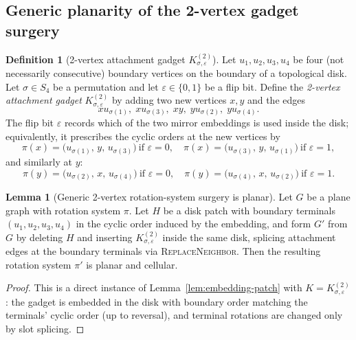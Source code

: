 \documentclass[12pt]{article}
\theoremstyle{definition}
\newtheorem{lemma}[theorem]{Lemma}
\newtheorem{definition}[theorem]{Definition}
\newcommand{\RefinedCFourGadgetVertices}{2}
\begin{document}
\subsection{Generic planarity of the \RefinedCFourGadgetVertices-vertex gadget surgery}
\label{subsec:generic-2v-planarity}

\begin{definition}[\RefinedCFourGadgetVertices-vertex attachment gadget $K^{(2)}_{\sigma,\varepsilon}$]
\label{def:2v-gadget}
Let $u_1,u_2,u_3,u_4$ be four (not necessarily consecutive) boundary vertices on the boundary of a topological disk.
Let $\sigma \in S_4$ be a permutation and let $\varepsilon\in\{0,1\}$ be a flip bit.
Define the \emph{\RefinedCFourGadgetVertices-vertex attachment gadget} $K^{(2)}_{\sigma,\varepsilon}$ by adding two new vertices $x,y$
and the edges
\[
xu_{\sigma(1)},\; xu_{\sigma(3)},\; xy,\; yu_{\sigma(2)},\; yu_{\sigma(4)}.
\]
The flip bit $\varepsilon$ records which of the two mirror embeddings is used inside the disk; equivalently,
it prescribes the cyclic orders at the new vertices by
\[
\pi(x) = \big(u_{\sigma(1)},\, y,\, u_{\sigma(3)}\big)\ \text{if }\varepsilon=0,\quad
\pi(x) = \big(u_{\sigma(3)},\, y,\, u_{\sigma(1)}\big)\ \text{if }\varepsilon=1,
\]
and similarly at $y$:
\[
\pi(y) = \big(u_{\sigma(2)},\, x,\, u_{\sigma(4)}\big)\ \text{if }\varepsilon=0,\quad
\pi(y) = \big(u_{\sigma(4)},\, x,\, u_{\sigma(2)}\big)\ \text{if }\varepsilon=1.
\]
\end{definition}

\begin{lemma}[Generic \RefinedCFourGadgetVertices-vertex rotation-system surgery is planar]
\label{lem:generic-2v-planarity}
Let $G$ be a plane graph with rotation system $\pi$.
Let $H$ be a disk patch with boundary terminals $(u_1,u_2,u_3,u_4)$ in the cyclic order induced by the embedding,
and form $G'$ from $G$ by deleting $H$ and inserting $K^{(2)}_{\sigma,\varepsilon}$ inside the same disk, splicing attachment edges at the boundary terminals via \textsc{ReplaceNeighbor}.
Then the resulting rotation system $\pi'$ is planar and cellular.
\end{lemma}

\begin{proof}
This is a direct instance of Lemma~\ref{lem:embedding-patch} with $K=K^{(2)}_{\sigma,\varepsilon}$:
the gadget is embedded in the disk with boundary order matching the terminals' cyclic order (up to reversal),
and terminal rotations are changed only by slot splicing.
\end{proof}
\end{document}
